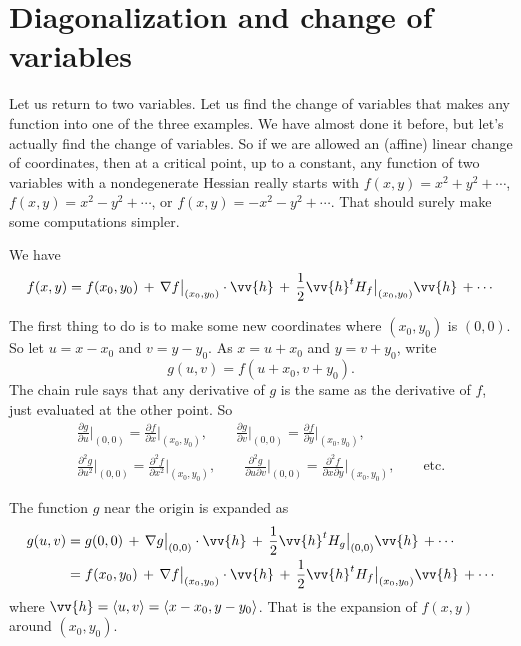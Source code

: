 \documentclass[12pt]{article}
\begin{document}
\section*{Diagonalization and change of variables}

Let us return to two variables.  Let us find the 
change of variables that makes any function into one of the three
examples.  We have almost done it before, but let's actually find
the change of variables.
So if we are allowed an (affine) linear change of coordinates, then at
a critical point, up to a constant, any
function of two variables with a nondegenerate Hessian really starts with
$f(x,y) = x^2+y^2 + \cdots$, 
$f(x,y) = x^2-y^2 + \cdots$, or
$f(x,y) = -x^2-y^2 + \cdots$.
That should surely make some computations simpler.

We have
\[
f(x,y) = f(x_0,y_0) \, + \,
\nabla f\big|_{(x_0,y_0)} \cdot \vv{h}
\, + \,
\frac{1}{2} \vv{h}^{t} H_f\big|_{(x_0,y_0)} \vv{h} \,
+ \cdots
\]

The first thing to do is to make some new coordinates where $(x_0,y_0)$ is
$(0,0)$.  So let $u = x-x_0$ and $v=y-y_0$.  As $x = u+x_0$ and $y = v+y_0$,
write
\[
g(u,v) = f(u+x_0,v+y_0).
\]
The chain rule says that any derivative of $g$ is the same as the derivative
of $f$, just evaluated at the other point.  So
\begin{multline*}
\frac{\partial g}{\partial u}\Big|_{(0,0)} = 
\frac{\partial f}{\partial x}\Big|_{(x_0,y_0)}, \qquad
\frac{\partial g}{\partial v}\Big|_{(0,0)} = 
\frac{\partial f}{\partial y}\Big|_{(x_0,y_0)}, \\
\frac{\partial^2 g}{\partial u^2}\Big|_{(0,0)} = 
\frac{\partial^2 f}{\partial x^2}\Big|_{(x_0,y_0)}, \qquad
\frac{\partial^2 g}{\partial u \partial v}\Big|_{(0,0)} = 
\frac{\partial^2 f}{\partial x \partial y}\Big|_{(x_0,y_0)}, \qquad \text{etc.}
\end{multline*}

The function $g$ near the origin is expanded as
\[
\begin{split}
g(u,v) & = g(0,0) \, + \,
\nabla g\big|_{(0,0)} \cdot \vv{h}
\, + \,
\frac{1}{2} \vv{h}^{t} H_g\big|_{(0,0)} \vv{h} \,
+ \cdots
\\
& =
f(x_0,y_0) \, + \,
\nabla f\big|_{(x_0,y_0)} \cdot \vv{h}
\, + \,
\frac{1}{2} \vv{h}^{t} H_f\big|_{(x_0,y_0)} \vv{h} \,
+ \cdots
\end{split}
\]
where $\vv{h} = \langle u,v \rangle = \langle x-x_0, y-y_0 \rangle$.
That is the expansion of $f(x,y)$ around $(x_0,y_0)$.
\end{document}
